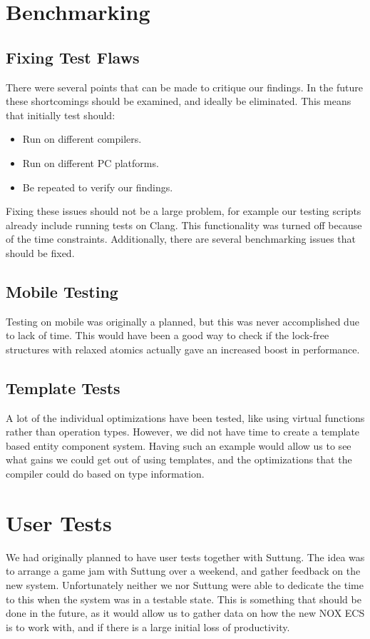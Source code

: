 \section{Benchmarking}
\subsection{Fixing Test Flaws}
There were several points that can be made to critique our findings.
In the future these shortcomings should be examined, and ideally be eliminated.
This means that initially test should:
\begin{itemize}
    \item
    Run on different compilers.
    \item
    Run on different PC platforms.
    \item
    Be repeated to verify our findings.
\end{itemize}
Fixing these issues should not be a large problem, for example our testing scripts already include
running tests on Clang. This functionality was turned off because of the time constraints.
Additionally, there are several benchmarking issues that should be fixed.

\subsection{Mobile Testing}
Testing on mobile was originally a planned, but this was never accomplished due to lack of time.
This would have been a good way to check if the lock-free structures with relaxed atomics actually
gave an increased boost in performance.

\subsection{Template Tests}
A lot of the individual optimizations have been tested, like using virtual functions rather than
operation types. However, we did not have time to create a template based entity component system.
Having such an example would allow us to see what gains we could get out of using templates,
and the optimizations that the compiler could do based on type information.

\section{User Tests}
We had originally planned to have user tests together with Suttung.
The idea was to arrange a game jam with Suttung over a weekend,
and gather feedback on the new system.
Unfortunately neither we nor Suttung were able to dedicate the time to this when the system
was in a testable state.
This is something that should be done in the future, as it would allow us to gather
data on how the new NOX ECS is to work with, and if there is a large initial loss of productivity.
